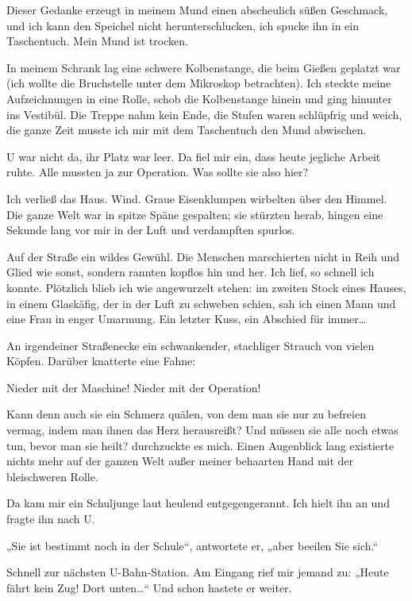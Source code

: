 Dieser Gedanke erzeugt in meinem Mund einen abscheulich süßen
Geschmack, und ich kann den Speichel nicht herunterschlucken, ich
spucke ihn in ein Taschentuch. Mein Mund ist trocken.

In meinem Schrank lag eine schwere Kolbenstange, die beim Gießen
geplatzt war (ich wollte die Bruchstelle unter dem Mikroskop
betrachten). Ich steckte meine Aufzeichnungen in eine Rolle, schob
die Kolbenstange hinein und ging hinunter ins Vestibül. Die Treppe
nahm kein Ende, die Stufen waren schlüpfrig und weich, die ganze
Zeit musste ich mir mit dem Taschentuch den Mund abwischen.

U war nicht da, ihr Platz war leer. Da fiel mir ein, dass heute
jegliche Arbeit ruhte. Alle mussten ja zur Operation. Was sollte
sie also hier?

Ich verließ das Haus. Wind. Graue Eisenklumpen wirbelten über den
Himmel. Die ganze Welt war in spitze Späne gespalten; sie stürzten
herab, hingen eine Sekunde lang vor mir in der Luft und verdampften
spurlos.

Auf der Straße ein wildes Gewühl. Die Menschen
marschierten nicht in Reih und Glied wie sonst, sondern rannten
kopflos hin und her. Ich lief, so schnell ich konnte. Plötzlich
blieb ich wie angewurzelt stehen: im zweiten Stock eines Hauses, in
einem Glaskäfig, der in der Luft zu schweben schien, sah ich einen
Mann und eine Frau in enger Umarmung. Ein letzter Kuss, ein
Abschied für immer\ldots{}

An irgendeiner Straßenecke ein schwankender, stachliger Strauch von
vielen Köpfen. Darüber knatterte eine Fahne:

\begin{meldung}
Nieder mit der Maschine! Nieder mit der Operation!
\end{meldung}

Kann denn auch sie ein Schmerz
quälen, von dem man sie nur zu befreien vermag, indem man ihnen das
Herz herausreißt? Und müssen sie alle noch etwas tun, bevor
man sie heilt? durchzuckte es mich. Einen Augenblick lang
existierte nichts mehr auf der ganzen Welt außer meiner behaarten
Hand mit der bleischweren Rolle.

Da kam mir ein Schuljunge laut
heulend entgegengerannt. Ich hielt ihn an und fragte ihn nach U.

„Sie ist bestimmt noch in der Schule“, antwortete er, „aber beeilen
Sie sich.“

Schnell zur nächsten U-Bahn-Station. Am Eingang rief mir jemand zu:
„Heute fährt kein Zug! Dort unten\ldots{}“ Und schon hastete er
weiter.

